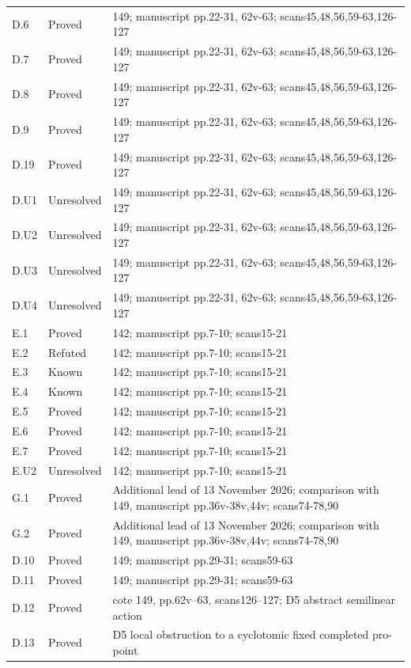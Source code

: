 {\begin{longtable}{p{1.9cm}p{1.7cm}p{10.3cm}}
D.6 & Proved & 149; manuscript pp.22-31, 62v-63; scans45,48,56,59-63,126-127 \\
D.7 & Proved & 149; manuscript pp.22-31, 62v-63; scans45,48,56,59-63,126-127 \\
D.8 & Proved & 149; manuscript pp.22-31, 62v-63; scans45,48,56,59-63,126-127 \\
D.9 & Proved & 149; manuscript pp.22-31, 62v-63; scans45,48,56,59-63,126-127 \\
D.19 & Proved & 149; manuscript pp.22-31, 62v-63; scans45,48,56,59-63,126-127 \\
D.U1 & Unresolved & 149; manuscript pp.22-31, 62v-63; scans45,48,56,59-63,126-127 \\
D.U2 & Unresolved & 149; manuscript pp.22-31, 62v-63; scans45,48,56,59-63,126-127 \\
D.U3 & Unresolved & 149; manuscript pp.22-31, 62v-63; scans45,48,56,59-63,126-127 \\
D.U4 & Unresolved & 149; manuscript pp.22-31, 62v-63; scans45,48,56,59-63,126-127 \\
E.1 & Proved & 142; manuscript pp.7-10; scans15-21 \\
E.2 & Refuted & 142; manuscript pp.7-10; scans15-21 \\
E.3 & Known & 142; manuscript pp.7-10; scans15-21 \\
E.4 & Known & 142; manuscript pp.7-10; scans15-21 \\
E.5 & Proved & 142; manuscript pp.7-10; scans15-21 \\
E.6 & Proved & 142; manuscript pp.7-10; scans15-21 \\
E.7 & Proved & 142; manuscript pp.7-10; scans15-21 \\
E.U2 & Unresolved & 142; manuscript pp.7-10; scans15-21 \\
G.1 & Proved & Additional lead of 13 November 2026; comparison with 149, manuscript pp.36v-38v,44v; scans74-78,90 \\
G.2 & Proved & Additional lead of 13 November 2026; comparison with 149, manuscript pp.36v-38v,44v; scans74-78,90 \\
D.10 & Proved & 149; manuscript pp.29-31; scans59-63 \\
D.11 & Proved & 149; manuscript pp.29-31; scans59-63 \\
D.12 & Proved & cote 149, pp.62v--63, scans126--127; D5 abstract semilinear action \\
D.13 & Proved & D5 local obstruction to a cyclotomic fixed completed pro-point \\

\end{longtable}}
